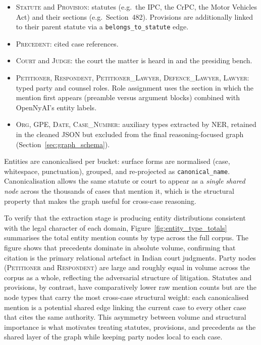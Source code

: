 \begin{sloppypar}
\begin{itemize}
  \item \textsc{Statute} and \textsc{Provision}: statutes (e.g.\ the IPC,
    the CrPC, the Motor Vehicles Act) and their sections (e.g.\ Section~482).
    Provisions are additionally linked to their parent statute via a
    \texttt{belongs\_to\_statute} edge.
  \item \textsc{Precedent}: cited case references.
  \item \textsc{Court} and \textsc{Judge}: the court the matter is heard in
    and the presiding bench.
  \item \textsc{Petitioner}, \textsc{Respondent},
    \textsc{Petitioner\_Lawyer}, \textsc{Defence\_Lawyer}, \textsc{Lawyer}:
    typed party and counsel roles. Role assignment uses the section in which
    the mention first appears (preamble versus argument blocks) combined with
    OpenNyAI's entity labels.
  \item \textsc{Org}, \textsc{GPE}, \textsc{Date}, \textsc{Case\_Number}:
    auxiliary types extracted by NER, retained in the cleaned JSON but excluded
    from the final reasoning-focused graph (Section~\ref{sec:graph_schema}).
\end{itemize}
\end{sloppypar}

Entities are canonicalised per bucket: surface forms are normalised (case,
whitespace, punctuation), grouped, and re-projected as \texttt{canonical\_name}.
Canonicalisation allows the same statute or court to appear as a \emph{single
shared node} across the thousands of cases that mention it, which is the
structural property that makes the graph useful for cross-case reasoning.

To verify that the extraction stage is producing entity distributions consistent
with the legal character of each domain, Figure~\ref{fig:entity_type_totals}
summarises the total entity mention counts by type across the full corpus. The
figure shows that precedents dominate in absolute volume, confirming that citation
is the primary relational artefact in Indian court judgments. Party nodes
(\textsc{Petitioner} and \textsc{Respondent}) are large and roughly equal in
volume across the corpus as a whole, reflecting the adversarial structure of
litigation. Statutes and provisions, by contrast, have comparatively lower raw
mention counts but are the node types that carry the most cross-case structural
weight: each canonicalised mention is a potential shared edge linking the current
case to every other case that cites the same authority. This asymmetry between
volume and structural importance is what motivates treating statutes, provisions,
and precedents as the shared layer of the graph while keeping party nodes local
to each case.

